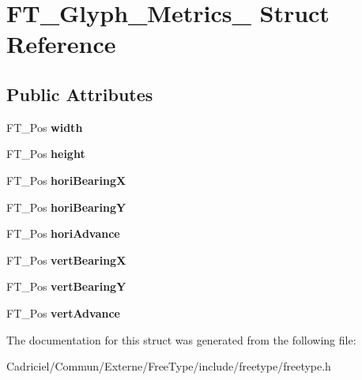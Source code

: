 \hypertarget{struct_f_t___glyph___metrics__}{\section{F\-T\-\_\-\-Glyph\-\_\-\-Metrics\-\_\- Struct Reference}
\label{struct_f_t___glyph___metrics__}
}
\subsection*{Public Attributes}
\begin{DoxyCompactItemize}
\item 
\hypertarget{struct_f_t___glyph___metrics___a0ff1be869e6a28d1f2990b0e5719dca9}{F\-T\-\_\-\-Pos {\bfseries width}}\label{struct_f_t___glyph___metrics___a0ff1be869e6a28d1f2990b0e5719dca9}

\item 
\hypertarget{struct_f_t___glyph___metrics___aa2a76ec448ec9d18acf343f01b77cb21}{F\-T\-\_\-\-Pos {\bfseries height}}\label{struct_f_t___glyph___metrics___aa2a76ec448ec9d18acf343f01b77cb21}

\item 
\hypertarget{struct_f_t___glyph___metrics___a2afc877f52c8a8910ec144a1948186cc}{F\-T\-\_\-\-Pos {\bfseries hori\-Bearing\-X}}\label{struct_f_t___glyph___metrics___a2afc877f52c8a8910ec144a1948186cc}

\item 
\hypertarget{struct_f_t___glyph___metrics___afd97c10d43ed1f66598a18884468b536}{F\-T\-\_\-\-Pos {\bfseries hori\-Bearing\-Y}}\label{struct_f_t___glyph___metrics___afd97c10d43ed1f66598a18884468b536}

\item 
\hypertarget{struct_f_t___glyph___metrics___af12db260a90b8a7c938ad48ebf20ccbe}{F\-T\-\_\-\-Pos {\bfseries hori\-Advance}}\label{struct_f_t___glyph___metrics___af12db260a90b8a7c938ad48ebf20ccbe}

\item 
\hypertarget{struct_f_t___glyph___metrics___aead5c5637b983b811738bff3bcea8cea}{F\-T\-\_\-\-Pos {\bfseries vert\-Bearing\-X}}\label{struct_f_t___glyph___metrics___aead5c5637b983b811738bff3bcea8cea}

\item 
\hypertarget{struct_f_t___glyph___metrics___a7f1aba91b86fddeb11030eab15dcce08}{F\-T\-\_\-\-Pos {\bfseries vert\-Bearing\-Y}}\label{struct_f_t___glyph___metrics___a7f1aba91b86fddeb11030eab15dcce08}

\item 
\hypertarget{struct_f_t___glyph___metrics___a594f43c64fe5c12a399a0f0a47c04990}{F\-T\-\_\-\-Pos {\bfseries vert\-Advance}}\label{struct_f_t___glyph___metrics___a594f43c64fe5c12a399a0f0a47c04990}

\end{DoxyCompactItemize}


The documentation for this struct was generated from the following file\-:\begin{DoxyCompactItemize}
\item 
Cadriciel/\-Commun/\-Externe/\-Free\-Type/include/freetype/freetype.\-h\end{DoxyCompactItemize}

